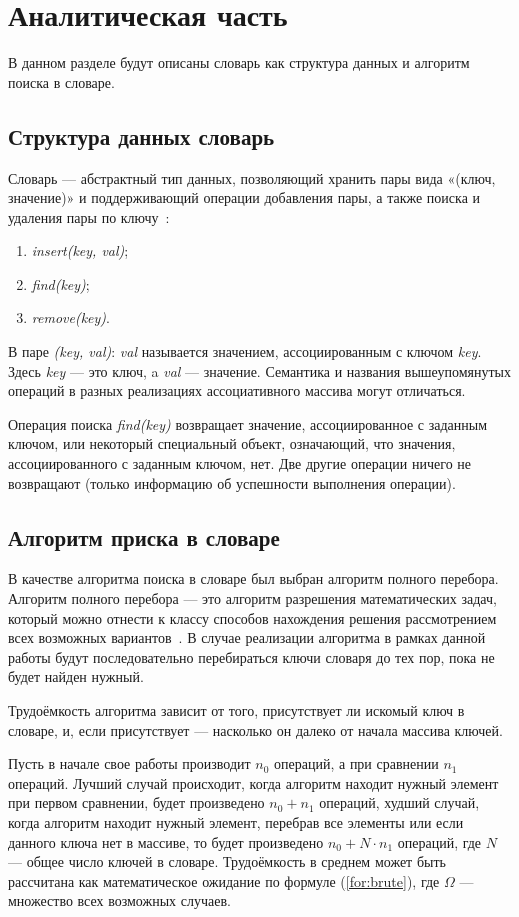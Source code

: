 \chapter{Аналитическая часть}
В данном разделе будут описаны словарь как структура данных и алгоритм поиска в словаре.

\section{Структура данных словарь}

Словарь --- абстрактный тип данных, позволяющий хранить пары вида «(ключ, значение)» и поддерживающий операции добавления пары, а также поиска и удаления пары по ключу~\cite{dict}:
\begin{enumerate}[label=\arabic*)]
	\item \textit{insert(key, val)};
	\item \textit{find(key)};
	\item \textit{remove(key)}.
\end{enumerate}

В паре \textit{(key, val)}: \textit{val} называется значением, ассоциированным с ключом \textit{key}. Здесь \textit{key} --- это ключ, a \textit{val} --- значение. Семантика и названия вышеупомянутых операций в разных реализациях ассоциативного массива могут отличаться.

Операция поиска \textit{find(key)} возвращает значение, ассоциированное с заданным ключом, или некоторый специальный объект, означающий, что значения, ассоциированного с заданным ключом, нет. Две другие операции ничего не возвращают (только информацию об успешности выполнения операции).

\section{Алгоритм приска в словаре}
В качестве алгоритма поиска в словаре был выбран алгоритм полного перебора.
Алгоритм полного перебора --- это алгоритм разрешения математических задач, который можно отнести к классу способов нахождения решения рассмотрением всех возможных вариантов~\cite{all_alg}.
В случае реализации алгоритма в рамках данной работы будут последовательно перебираться ключи словаря до тех пор, пока не будет найден нужный.

Трудоёмкость алгоритма зависит от того, присутствует ли искомый ключ в словаре, и, если присутствует --- насколько он далеко от начала массива ключей.

Пусть в начале свое работы производит $n_{0}$ операций, а при сравнении $n_{1}$ операций.
Лучший случай происходит, когда алгоритм находит нужный элемент при первом сравнении, будет произведено $n_0 + n_1$ операций, худший случай, когда алгоритм находит нужный элемент, перебрав все элементы или если данного ключа нет в массиве, то будет произведено $n_0 + N \cdot n_1$ операций, где $N$ --- общее число ключей в словаре. Трудоёмкость в среднем может быть рассчитана как математическое ожидание по формуле (\ref{for:brute}), где $\Omega$ --- множество всех возможных случаев.

